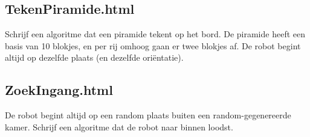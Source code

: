 \subsection{TekenPiramide.html}

Schrijf een algoritme dat een piramide tekent op het bord. De piramide heeft een basis van 10 blokjes, en per rij omhoog gaan er twee blokjes af. De robot begint altijd op dezelfde plaats (en dezelfde ori\"entatie).

\subsection{ZoekIngang.html}

De robot begint altijd op een random plaats buiten een random-gegenereerde kamer. Schrijf een algoritme dat de robot naar binnen loodst.

